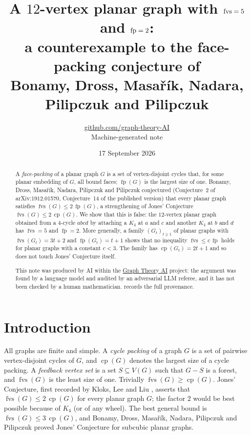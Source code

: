 \documentclass[11pt,a4paper]{article}
\title{A $12$-vertex planar graph with $\fvs=5$ and $\fp=2$:\\ a counterexample to the face-packing conjecture of\\ Bonamy, Dross, Masařík, Nadara, Pilipczuk and Pilipczuk}
\author{\href{https://github.com/graph-theory-AI}{github.com/graph-theory-AI}\\[2pt] \normalsize Machine-generated note}
\date{17 September 2026}
\theoremstyle{plain}
\theoremstyle{definition}
\theoremstyle{remark}
\newcommand{\fvs}{\operatorname{fvs}}
\newcommand{\cp}{\operatorname{cp}}
\newcommand{\fp}{\operatorname{fp}}
\newcommand{\Gtt}{G_t}
\begin{document}
\maketitle

\begin{abstract}
A \emph{face-packing} of a planar graph $G$ is a set of vertex-disjoint cycles that, for some planar embedding of $G$, all bound faces; $\fp(G)$ is the largest size of one. Bonamy, Dross, Masařík, Nadara, Pilipczuk and Pilipczuk conjectured (Conjecture~2 of arXiv:1912.01570, Conjecture~14 of the published version) that every planar graph satisfies $\fvs(G)\le 2\,\fp(G)$, a strengthening of Jones' Conjecture $\fvs(G)\le 2\,\cp(G)$. We show that this is false: the $12$-vertex planar graph obtained from a $4$-cycle $abcd$ by attaching a $K_4$ at $a$ and $c$ and another $K_4$ at $b$ and $d$ has $\fvs=5$ and $\fp=2$. More generally, a family $(\Gtt)_{t\ge1}$ of planar graphs with $\fvs(\Gtt)=3t+2$ and $\fp(\Gtt)=t+1$ shows that no inequality $\fvs\le c\,\fp$ holds for planar graphs with a constant $c<3$. The family has $\cp(\Gtt)=2t+1$ and so does not touch Jones' Conjecture itself.

\medskip\noindent\small
This note was produced by AI within the \href{https://github.com/graph-theory-AI/Graph-Theory-LLM-Proofs}{Graph Theory AI} project:
the argument was found by a language model and audited by an adversarial LLM
referee, and it has not been checked by a human mathematician.
 records the full provenance.
\end{abstract}

\section{Introduction}

All graphs are finite and simple. A \emph{cycle packing} of a graph $G$ is a set of pairwise vertex-disjoint cycles of $G$, and $\cp(G)$ denotes the largest size of a cycle packing. A \emph{feedback vertex set} is a set $S\subseteq V(G)$ such that $G-S$ is a forest, and $\fvs(G)$ is the least size of one. Trivially $\fvs(G)\ge\cp(G)$. Jones' Conjecture, first recorded by Kloks, Lee and Liu \cite{KLL02}, asserts that $\fvs(G)\le 2\,\cp(G)$ for every planar graph $G$; the factor $2$ would be best possible because of $K_4$ (or of any wheel). The best general bound is $\fvs(G)\le 3\,\cp(G)$, and Bonamy, Dross, Masařík, Nadara, Pilipczuk and Pilipczuk \cite{BDMNPP19,BDMNPP21} proved Jones' Conjecture for subcubic planar graphs.
\end{document}
